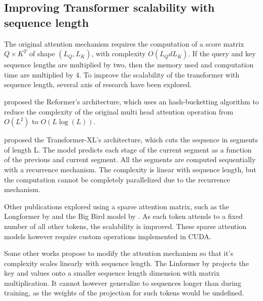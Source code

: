 \subsection{Improving Transformer scalability with sequence
length}

The original attention mechanism requires the computation of a score
matrix $Q \times K^T$ of shape $(L_Q, L_K)$, with complexity
$O(L_QdL_K)$. If the query and key sequence lengths are multiplied by
two, then the memory used and computation time are multiplied by 4. To
improve the scalability of the transformer with sequence length, several axis of research have been explored.

\citet{kitaev2020reformer} proposed
the Reformer's architecture, which uses an hash-bucketting algorithm to
reduce the complexity of the original multi head attention operation
from $O(L^2)$ to $O(L\log(L))$.

\citet{dai2019transformerxl} proposed the
Transformer-XL's architecture, which cuts the sequence in segments of
length L. The model predicts each stage of the current segment as a
function of the previous and current segment. All the segments are
computed sequentially with a recurrence mechanism. The complexity is linear
with sequence length, but the computation cannot be completely
 parallelized due to the recurrence mechanism.

Other publications explored using a sparse attention matrix, such as the
 Longformer by \citet{beltagy2020longformer} and the Big Bird model by
 \citet{zaheer2021big}. As each
token attends to a fixed number of all other tokens, the scalability is
improved. These sparse attention models however require custom
operations implemented in CUDA.

Some other works propose to modify the attention mechanism so that it's complexity scales linearly with sequence length. The Linformer by
\citet{wang2020linformer} projects the
 key and values onto a smaller sequence length dimension with matrix
 multiplication. It cannot however generalize to sequences longer than
 during training, as the weights of the projection for such tokens would
 be undefined.

